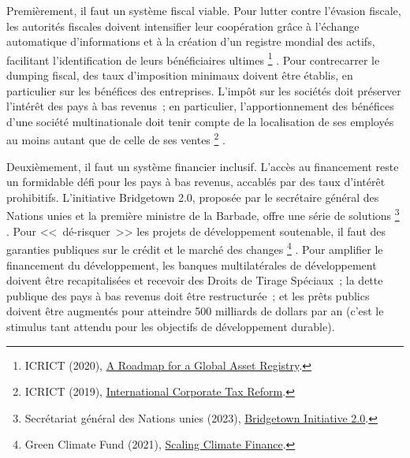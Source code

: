 \documentclass[a5paper,french,openany]{memoir}
\begin{document}
Premièrement, il faut un système fiscal viable. Pour lutter contre l'évasion fiscale, les autorités fiscales doivent intensifier leur coopération grâce à l'échange automatique d'informations et à la création d'un registre mondial des actifs, facilitant l'identification de leurs bénéficiaires ultimes
\footnote{ICRICT (2020), \href{https://static1.squarespace.com/static/5a0c602bf43b5594845abb81/t/5c988368eef1a1538c2ae7eb/1553498989927/GAR.pdf}{A Roadmap for a Global Asset Registry}.}%
. Pour contrecarrer le dumping fiscal, des taux d'imposition minimaux doivent être établis, en particulier sur les bénéfices des entreprises. L'impôt sur les sociétés doit préserver l'intérêt des pays à bas revenus~; en particulier, l'apportionnement des bénéfices d'une société multinationale doit tenir compte de la localisation de ses employés au moins autant que de celle de ses ventes
\footnote{ICRICT (2019), \href{https://static1.squarespace.com/static/5a0c602bf43b5594845abb81/t/5d979e6dc5f7cb7b66842c49/1570217588721/ICRICT-INTERNATIONAL+CORPORATE+TAX+REFORM.pdf}{International Corporate Tax Reform}.}%
. 

Deuxièmement, il faut un système financier inclusif. L'accès au financement reste un formidable défi pour les pays à bas revenus, accablés par des taux d'intérêt prohibitifs. L'initiative Bridgetown 2.0, proposée par le secrétaire général des Nations unies et la première ministre de la Barbade, offre une série de solutions
\footnote{Secrétariat général des Nations unies (2023), \href{https://www.un.org/sustainabledevelopment/blog/2023/04/press-release-with-clock-ticking-for-the-sdgs-un-chief-and-barbados-prime-minister-call-for-urgent-action-to-transform-broken-global-financial-system/}{Bridgetown Initiative 2.0}.}%
. Pour <<~dé-risquer~>> les projets de développement soutenable, il faut des garanties publiques sur le crédit et le marché des changes
\footnote{Green Climate Fund (2021), \href{https://www.greenclimate.fund/sites/default/files/document/scaling-climate-finance-context-covid-19-full-report\_0.pdf}{Scaling Climate Finance}.}%
. Pour amplifier le financement du développement, les banques multilatérales de développement doivent être recapitalisées et recevoir des Droits de Tirage Spéciaux~; la dette publique des pays à bas revenus doit être restructurée~; et les prêts publics doivent être augmentés pour atteindre 500 milliards de dollars par an (c'est le stimulus tant attendu pour les objectifs de développement durable). 
\end{document}
